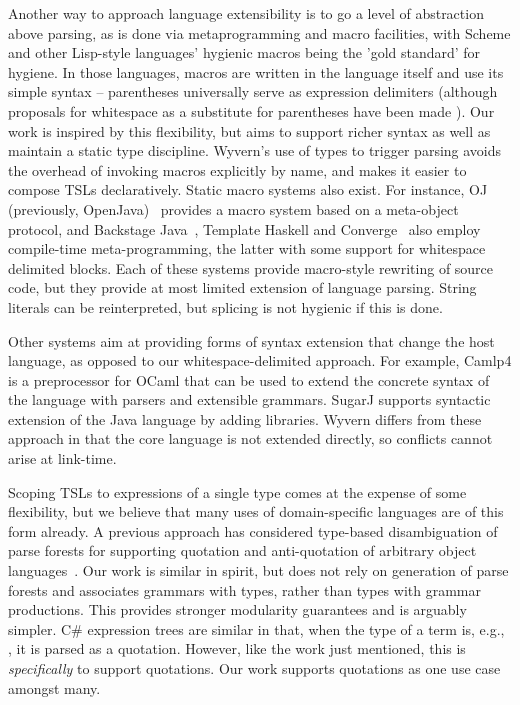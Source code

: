 Another way to approach language extensibility is to go a level of abstraction above parsing, as is done via metaprogramming and macro facilities, with Scheme and other Lisp-style languages' hygienic macros being the 'gold standard' for hygiene. In those languages, macros are written in the language itself and use its simple syntax -- parentheses universally serve as expression delimiters (although proposals for whitespace as a substitute for parentheses have been made \cite{srfi-49}). Our work is inspired by this flexibility, but aims to support richer syntax as well as maintain a static type discipline. Wyvern's use of types to trigger parsing  avoids the overhead of invoking macros explicitly by name, and makes it easier to compose TSLs declaratively. Static macro systems also exist. For instance, OJ (previously, OpenJava)~\cite{Tatsubori00openjava:a} provides a macro system based on a meta-object protocol, and Backstage Java~\cite{Palmer:2011:BJM:2048066.2048137}, Template Haskell \cite{sheard2002template} and Converge~\cite{Tratt:2008:DSL:1391956.1391958} also employ compile-time meta-programming, the latter with some support for whitespace delimited blocks.  Each of these systems provide macro-style rewriting of source code, but they provide at most limited extension of language parsing. String literals can be reinterpreted, but splicing is not hygienic if this is done.

Other systems aim at providing forms of syntax extension that change the host language, as opposed to our whitespace-delimited approach.  For example, Camlp4 \cite{camlp4} is a preprocessor for OCaml that can be used to extend the concrete syntax of the language with parsers and extensible grammars.  SugarJ \cite{Erdweg:2011:SLL:2048147.2048199} supports syntactic extension of the Java language by adding libraries. Wyvern differs from these approach in that the core language is not extended directly, so conflicts cannot arise at link-time.

Scoping TSLs to expressions of a single type comes at the expense of some flexibility, but we believe that many uses of domain-specific languages are of this form already. A previous approach has considered type-based disambiguation of parse forests for supporting quotation and anti-quotation of arbitrary object languages~\cite{bravenboer2005generalized}. Our work is similar in spirit, but does not rely on generation of parse forests and associates grammars with types, rather than types with grammar productions.  This provides stronger modularity guarantees and is arguably simpler. 
 C\# expression trees \cite{Csharp} are similar in that, when the type of a term is, e.g., , it is parsed as a quotation. However, like the work just mentioned, this is \emph{specifically} to support quotations. Our work supports quotations as one use case amongst many.
 
